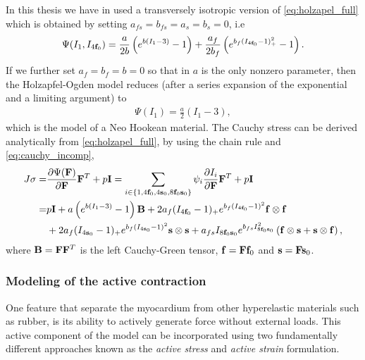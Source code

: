 In this thesis we have in used a transversely isotropic version of
\eqref{eq:holzapel_full} which is obtained by setting $a_{fs} =
b_{fs}= a_s = b_s = 0$, i.e 
\begin{align}
  \label{eq:holzapel_trans}
  \begin{split}
  \Psi(I_1, I_{4\mathbf{f}_0}) = \frac{a}{2 b} \left( e^{ b (I_1 - 3)}  -1 \right)
  + \frac{a_f}{2 b_f} \left( e^{ b_f (I_{4\mathbf{f}_0} - 1)_+^2} -1 \right).
  \end{split}
\end{align}
If we further set $a_f = b_f = b = 0$ so that in $a$ is the
only nonzero parameter, then the Holzapfel-Ogden model reduces (after a
series expansion of the exponential and a limiting argument) to
\begin{align}
  \Psi(I_1)  = \frac{a}{2} \left( I_1 - 3 \right), 
\end{align}
which is the model of a Neo Hookean material. The Cauchy stress can be derived
analytically from \eqref{eq:holzapel_full}, by using the chain rule and
\eqref{eq:cauchy_incomp}, 
\begin{align}
  \begin{split}
    J\mathbf{\sigma}
    =& \frac{\partial \Psi(\mathbf{F})}{\partial \mathbf{F}}\mathbf{F}^{T} + p \mathbf{I}
    = \sum_{i \in \left\{ 1, 4\mathbf{f}_0,  4\mathbf{s}_0,  8\mathbf{f}_0\mathbf{s}_0 \right\} }
    \psi_i \frac{\partial I_i}{\partial \mathbf{F}}\mathbf{F}^{T} + p \mathbf{I} \\
    =& p \mathbf{I} + a \left( e^{ b (I_1 - 3)}  -1 \right) \mathbf{B} 
    + 2 a_f (I_{4\mathbf{f}_0} - 1)_+  e^{ b_f (I_{4\mathbf{f}_0} - 1)^2} \mathbf{f} \otimes \mathbf{f} \\
    &+ 2 a_f (I_{4\mathbf{s}_0} - 1)_+  e^{ b_f (I_{4\mathbf{s}_0} - 1)^2} \mathbf{s} \otimes \mathbf{s} 
    + a_{fs} I_{8\mathbf{f}_0\mathbf{s}_0}  e^{ b_{fs} I_{8\mathbf{f}_0\mathbf{s}_0}^2} \left( \mathbf{f} \otimes \mathbf{s}  +  \mathbf{s} \otimes \mathbf{f} \right),
  \end{split}
\end{align}
where $\mathbf{B} = \mathbf{F} \mathbf{F}^{T}$ is the left Cauchy-Green tensor,
$\mathbf{f} = \mathbf{F} \mathbf{f}_0$ and $\mathbf{s} = \mathbf{F} \mathbf{s}_0$.

\subsubsection{Modeling of the active contraction}
  

One feature that separate the myocardium from other hyperelastic
materials such as rubber, is its ability to actively generate force
without external loads. This active component of the model can be
incorporated using two fundamentally different approaches known as the
\emph{active stress} and \emph{active strain} formulation.


